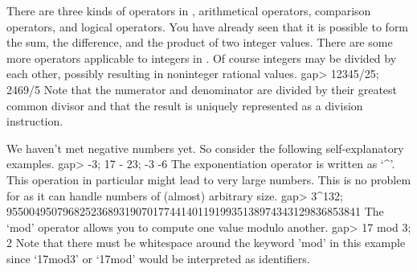 There are  three kinds  of operators in  {\GAP}, arithmetical  operators,
comparison operators, and logical operators.  You  have already seen that
it is possible to form  the sum,  the  difference, and the product of two
integer values.  There are some  more operators applicable to integers in
{\GAP}.   Of  course integers  may  be divided  by  each other,  possibly
resulting in noninteger rational values.
\beginexample
    gap> 12345/25;
    2469/5 
\endexample
Note  that  the numerator and denominator  are divided by their  greatest
common divisor  and that the result is uniquely represented as a division
instruction.

We     haven't met negative numbers      yet.  So consider the  following
self-explanatory examples.
\beginexample
    gap> -3; 17 - 23;
    -3
    -6 
\endexample
The exponentiation   operator  is  written  as  `^'. This   operation  in
particular might lead  to  very large numbers.  This  is  no problem  for
{\GAP} as it can handle numbers of (almost) arbitrary size.
\beginexample
    gap> 3^132;
    955004950796825236893190701774414011919935138974343129836853841 
\endexample
The `mod' operator allows you to compute one value modulo another.
\beginexample
    gap> 17 mod 3;
    2 
\endexample
Note  that  there must be   whitespace around the  keyword  'mod' in this
example since `17mod3' or `17mod' would be interpreted as identifiers.

